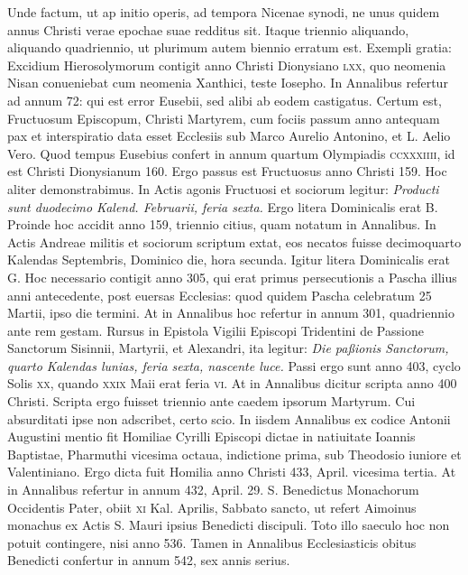 Unde factum, ut ap initio operis,
ad tempora Nicenae synodi, ne unus quidem annus Christi
verae epochae suae redditus sit.
Itaque triennio aliquando, aliquando
quadriennio, ut plurimum autem biennio erratum est.
Exempli
gratia: Excidium Hierosolymorum contigit anno Christi
Dionysiano \textsc{lxx}, quo neomenia Nisan conueniebat cum neomenia
Xanthici, teste Iosepho.
In Annalibus refertur ad annum
72: qui est error Eusebii, sed alibi ab eodem castigatus.
Certum est, Fructuosum Episcopum, Christi Martyrem, cum fociis
passum anno antequam pax et interspiratio data esset Ecclesiis
sub Marco Aurelio Antonino, et L. Aelio Vero.
Quod tempus Eusebius confert in annum quartum Olympiadis
 \textsc{ccxxxiiii},
id est Christi Dionysianum 160.
Ergo passus est Fructuosus anno Christi
159.
Hoc aliter demonstrabimus.
In Actis agonis Fructuosi et
sociorum legitur: \textit{Producti sunt duodecimo Kalend. Februarii, feria
sexta.}
Ergo litera Dominicalis erat B.
Proinde hoc accidit anno
159, triennio citius, quam notatum in Annalibus.
In Actis Andreae
militis et sociorum scriptum extat, eos necatos fuisse decimoquarto
Kalendas Septembris, Dominico die, hora secunda.
Igitur litera Dominicalis erat G.
Hoc necessario contigit anno 305,
qui erat primus persecutionis a Pascha illius anni antecedente, post
euersas Ecclesias: quod quidem Pascha celebratum 25 Martii, ipso
die termini.
At in Annalibus hoc refertur in annum 301, quadriennio
ante rem gestam.
Rursus in Epistola Vigilii Episcopi Tridentini
de Passione Sanctorum Sisinnii, Martyrii, et Alexandri,
ita legitur: \textit{Die paßionis Sanctorum, quarto Kalendas lunias, feria
sexta, nascente luce.}
Passi ergo sunt anno 403, cyclo Solis \textsc{xx}, quando
\textsc{xxix} Maii erat feria \textsc{vi}.
At in Annalibus dicitur scripta
anno 400 Christi.
Scripta ergo fuisset triennio ante caedem
ipsorum Martyrum.
Cui absurditati ipse non adscribet, certo scio.
In iisdem
Annalibus ex codice Antonii Augustini mentio fit Homiliae
Cyrilli Episcopi dictae in natiuitate Ioannis Baptistae, Pharmuthi
vicesima octaua, indictione prima, sub Theodosio iuniore et Valentiniano.
Ergo dicta fuit Homilia anno Christi 433, April. vicesima
tertia.
At in Annalibus refertur in annum 432, April. 29. S. Benedictus
Monachorum Occidentis Pater, obiit \textsc{xi} Kal. Aprilis, Sabbato
sancto, ut refert Aimoinus monachus ex Actis S. Mauri ipsius
Benedicti discipuli.
Toto illo saeculo hoc non potuit contingere, nisi
anno 536.
{}
Tamen in Annalibus Ecclesiasticis obitus Benedicti confertur
in annum 542, sex annis serius.

